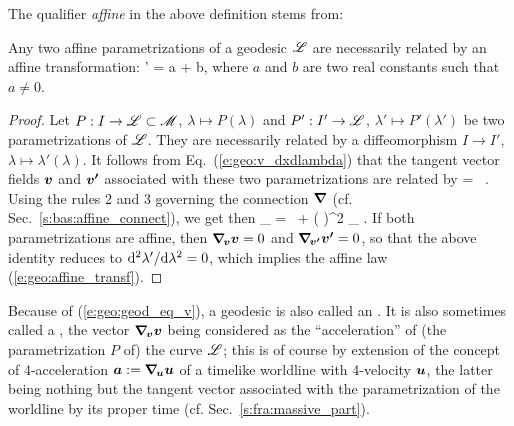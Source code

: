 The qualifier \emph{affine} in the above definition stems from:
\begin{prop}
Any two affine parametrizations of a geodesic $\mathscr{L}$ are necessarily
related by an affine transformation:
\be \label{e:geo:affine_transf}
    \lambda' = a \lambda + b,
\ee
where $a$ and $b$ are two real constants such that $a\not = 0$.
\end{prop}
\begin{proof}
Let $P: I \to  \mathscr{L}\subset\mathscr{M}$, $\lambda\mapsto P(\lambda)$ and
$P': I'\to \mathscr{L}$,
$\lambda'\mapsto P'(\lambda')$ be two
parametrizations of $\mathscr{L}$. They are necessarily related by a
diffeomorphism $I\to I'$, $\lambda \mapsto \lambda'(\lambda)$. It follows
from Eq.~(\ref{e:geo:v_dxdlambda}) that the tangent vector fields $\bm{v}$ and $\bm{v'}$
associated with these two parametrizations are related by
\be  \label{e:geo:change_tangent_vector}
     =  \,  .
\ee
Using the rules 2 and 3 governing the connection $\bm{\nabla}$ (cf. Sec.~\ref{s:bas:affine_connect}),
we get then
\be \label{e:geo:acc_v_acc_vp}
    \wnab_{\!} =  \, 
    + \left(  \right)^2 \wnab_{\!} .
\ee
If both parametrizations are affine, then $\bm{\nabla}_{\!\bm{v}}\bm{v} = 0$ and
$\bm{\nabla}_{\!\bm{v'}}\bm{v'} = 0$, so that the above identity reduces to
${\mathrm{d}^2\lambda'}/{\mathrm{d}\lambda^2} = 0$, which implies
the affine law (\ref{e:geo:affine_transf}).
\end{proof}

\begin{remark}
Because of (\ref{e:geo:geod_eq_v}), a geodesic is also called
an . It is also sometimes called
a , the
vector $\bm{\nabla}_{\!\bm{v}}\bm{v}$ being considered as the
``acceleration'' of (the parametrization $P$ of) the
curve $\mathscr{L}$; this is of course by extension of the concept of
4-acceleration $\bm{a} := \bm{\nabla}_{\!\bm{u}}\bm{u}$ of a timelike worldline
with 4-velocity $\bm{u}$, the latter being nothing but the tangent vector associated with
the parametrization of the worldline by its proper time (cf. Sec.~\ref{s:fra:massive_part}).
\end{remark}

